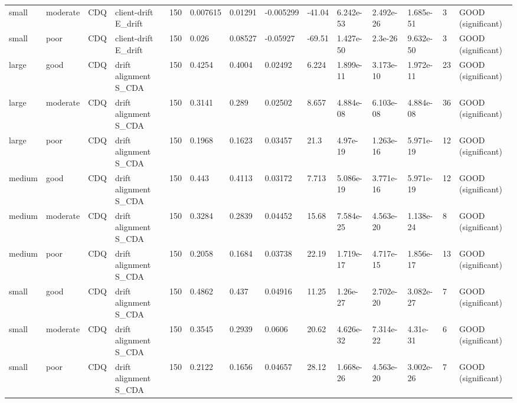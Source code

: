 \begin{table}[t]
\begin{tabular}{llllllllllllll}
small & moderate & CDQ & client-drift E\_drift & 150 & 0.007615 & 0.01291 & -0.005299 & -41.04 & 6.242e-53 & 2.492e-26 & 1.685e-51 & 3 & GOOD (significant) \\
small & poor & CDQ & client-drift E\_drift & 150 & 0.026 & 0.08527 & -0.05927 & -69.51 & 1.427e-50 & 2.3e-26 & 9.632e-50 & 3 & GOOD (significant) \\
large & good & CDQ & drift alignment S\_CDA & 150 & 0.4254 & 0.4004 & 0.02492 & 6.224 & 1.899e-11 & 3.173e-10 & 1.972e-11 & 23 & GOOD (significant) \\
large & moderate & CDQ & drift alignment S\_CDA & 150 & 0.3141 & 0.289 & 0.02502 & 8.657 & 4.884e-08 & 6.103e-08 & 4.884e-08 & 36 & GOOD (significant) \\
large & poor & CDQ & drift alignment S\_CDA & 150 & 0.1968 & 0.1623 & 0.03457 & 21.3 & 4.97e-19 & 1.263e-16 & 5.971e-19 & 12 & GOOD (significant) \\
medium & good & CDQ & drift alignment S\_CDA & 150 & 0.443 & 0.4113 & 0.03172 & 7.713 & 5.086e-19 & 3.771e-16 & 5.971e-19 & 12 & GOOD (significant) \\
medium & moderate & CDQ & drift alignment S\_CDA & 150 & 0.3284 & 0.2839 & 0.04452 & 15.68 & 7.584e-25 & 4.563e-20 & 1.138e-24 & 8 & GOOD (significant) \\
medium & poor & CDQ & drift alignment S\_CDA & 150 & 0.2058 & 0.1684 & 0.03738 & 22.19 & 1.719e-17 & 4.717e-15 & 1.856e-17 & 13 & GOOD (significant) \\
small & good & CDQ & drift alignment S\_CDA & 150 & 0.4862 & 0.437 & 0.04916 & 11.25 & 1.26e-27 & 2.702e-20 & 3.082e-27 & 7 & GOOD (significant) \\
small & moderate & CDQ & drift alignment S\_CDA & 150 & 0.3545 & 0.2939 & 0.0606 & 20.62 & 4.626e-32 & 7.314e-22 & 4.31e-31 & 6 & GOOD (significant) \\
small & poor & CDQ & drift alignment S\_CDA & 150 & 0.2122 & 0.1656 & 0.04657 & 28.12 & 1.668e-26 & 4.563e-20 & 3.002e-26 & 7 & GOOD (significant) \\
\bottomrule
\end{tabular}
\end{table}